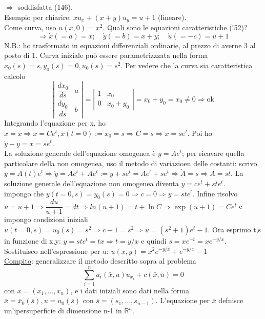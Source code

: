 \documentclass[a4paper,11pt]{report}
\newcommand{\Rn}{\mathbb{R}^n}
\newcommand{\x}{\bar{x}}
\begin{document}
$\Rightarrow$ soddisfatta (146).\\
Esempio per chiarire: $xu_x + (x+y)u_y = u+1$ (lineare). \\
Come curva, uso $u(x,0)=x^2$. Quali sono le equazioni caratteristiche (!52)?
$$
\Rightarrow \dot{x}(=a)=x; \quad \dot{y}(=b)=x+y; \quad \dot{u}(=-c)=u+1
$$
N.B.: ho trasformato in equazioni differenziali ordinarie, al prezzo di averne 3 al posto di 1.
Curva iniziale può essere parametrizzzata nella forma $x_0(s)=s, y_0(s)=0, u_0(s)=s^2$. Per vedere che la curva sia caratteristica calcolo
$$
\left|\begin{matrix}
\dfrac{dx_0}{ds} & a \\
\dfrac{dy_0}{ds} & b
\end{matrix}\right| = \left| \begin{matrix}
1 & x_0 \\
0 & x_0+y_0
\end{matrix} \right| = x_0 + y_0 = x_0 \neq 0 \Rightarrow \text{ok}
$$
Integrando l'equazione per x, ho $\dot{x}=x \Rightarrow x=Ce^t, x(t=0):=x_0 =s \Rightarrow C=s \Rightarrow x=se^t$. Poi ho $\dot{y}-y=x=se^t$.\\
La soluzione generale dell'equazione omogenea è $y=Ae^t$; per ricavare quella particolare della non omogenea, uso il metodo di variazioen delle costanti: scrivo $y=A(t)e^t \Rightarrow \dot{y}=\dot{A}e^t + Ae^t := y+se^t = Ae^t + se^t \Rightarrow \dot{A}=s \Rightarrow A=st$. La soluzione generale dell'equazione non omogenea diventa $y=ce^t + st e^t$.\\
impongo che $y(t=0,s)=y_0(s)=0 \Rightarrow c=0 \Rightarrow y=ste^t$. Infine risolvo $\dot{u}=u+1\Rightarrow \dfrac{du}{u+1}=dt \Rightarrow ln(u+1)=t+\ln C \Rightarrow \exp (u+1) = Ce^t$ e impongo condizioni iniziali $u(t=0,s)=u_0(s)=s^2 \Rightarrow c-1=s^2 \Rightarrow u=(s^2 + 1)e^t -1$. Ora esprimo t,s in funzione di x,y: $y=ste^t =tx \Rightarrow t=y/x$ e quindi $s=xe^{-t}=xe^{-y/x}$. Sostituisco nell'espressione per u: $u(x,y)=x^2e^{-y/x}+e^{-y/x}-1$\\
\underline{Compito}: generalizzare il metodo descritto sopra al problema
$$
\sum_{i=1}^n a_i(\x,u)u_{x_i} + c(\x,u)=0
$$
con $\x = (x_1,\dots,x_n)$, e i dati iniziali sono dati nella forma $\x=\x_0(\bar{s}), u=u_0(\bar{s})$ con $\bar{s}=(s_1,\dots,s_{n-1})$. L'equazione per $\x$ defnisce un'ipersuperficie di dimensione n-1 in $\Rn$.\\
\end{document}

